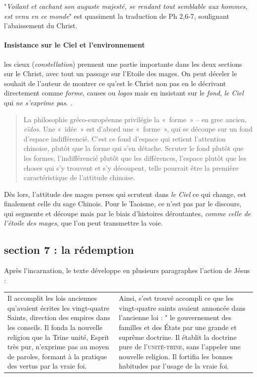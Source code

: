 "\textit{Voilant et cachant son auguste majesté, se rendant tout semblable aux hommes, est venu en ce monde}" est quasiment la traduction de Ph 2,6-7, soulignant l'abaissement du Christ.
 

\paragraph{Insistance sur le Ciel et l'environnement}  les cieux (\textit{constellation}) prennent une partie importante dans les deux sections sur le Christ, avec tout un passage sur l'Etoile des mages. On peut  déceler le souhait de l'auteur de montrer ce qu'est le Christ non pas en le décrivant directement comme \textit{forme},  causes ou \textit{logos} mais en insistant sur le \textit{fond},  \textit{le Ciel} qui \textit{ne s'exprime pas}. \cite[p. 109]{PolDroit:voyage} . 
\begin{quote}
    La philosophie gréco-européenne privilégie la « forme » – en grec ancien, \textit{eïdos}. Une « idée » est d’abord une « forme », qui se découpe sur un fond d’espace indifférencié. C’est ce fond d’espace qui retient l’attention chinoise, plutôt que la forme qui s’en détache. Scruter le fond plutôt que les formes, l’indifférencié plutôt que les différences, l’espace plutôt que les choses qui s’y trouvent et s’y découpent, telle pourrait être la première caractéristique de l’attitude chinoise.\cite[pp. 110-111]{PolDroit:voyage}  
\end{quote}
Dès lors, l'attitude des mages perses qui scrutent dans \textit{le Ciel} ce qui change, est finalement celle du sage Chinois. Pour le Taoisme, ce n'est pas par le discours, qui segmente et découpe mais par le biais d'histoires déroutantes, \textit{comme celle de l'étoile des mages}, que l'on peut transmettre la voie. \cite[p. 130-141]{PolDroit:voyage} 
 




\subsection{section 7 : la rédemption } 


Après l'incarnation, le texte développe en plusieurs paragraphes l'action de Jésus : 


\begin{tabular}{p{}p{}}
\\
Il accomplit les lois anciennes qu'avaient écrites les vingt-quatre Saints, direction des empires dans les conseils. Il fonda la nouvelle religion que la Trine unité, Esprit très pur, n'exprime pas au moyen de paroles, formant à la pratique des vertus par la vraie foi.  & Ainsi, s'est trouvé accompli ce que les vingt-quatre saints avaient annoncée dans l'ancienne loi : " le gouvernement des familles et des États par une grande et suprême doctrine. Il établit la doctrine pure de l'\textsc{unité-trine}, sans l'appeler une nouvelle religion. Il fortifia les bonnes habitudes par l'usage de la vraie foi. \\
\end{tabular}

